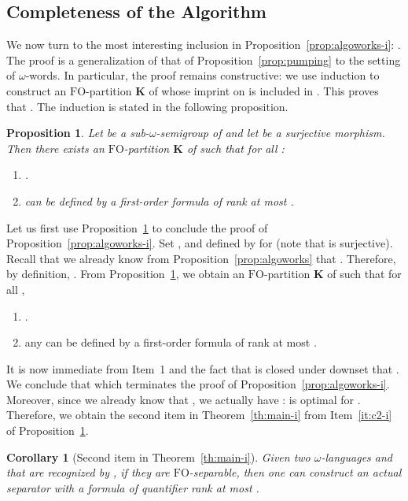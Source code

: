\documentclass{CSML}
\newcommand\Kb{\ensuremath{\mathbf{K}}\xspace}
\newcommand{\fo}{\ensuremath{\text{FO}}\xspace}
\newcommand\iwords{\ensuremath{\omega}-words\xspace}
\newcommand\ilangs{\ensuremath{\omega}-languages\xspace}
\newcommand\sisemi{sub-\ensuremath{\omega}-semigroup\xspace}
\theoremstyle{plain}
\newtheorem{corollary}[thm]{Corollary}
\newtheorem{proposition}[thm]{Proposition}
\begin{document}
\subsection{Completeness of the Algorithm}
\label{sec:compl-algor}

We now turn to the most interesting inclusion in
Proposition~\ref{prop:algoworks-i}: . The proof is a generalization of that of
Proposition~\ref{prop:pumping} to the setting of \iwords. In
particular, the proof remains constructive: we use induction to
construct an \fo-partition \Kb of  whose imprint on
 is included in . This proves that
. The induction is stated in the following
proposition.

\begin{proposition} \label{prop:pumping-i}
Let  be a \sisemi of\/  and let  be a surjective morphism. Then
there exists an \fo-partition \Kb of  such that for all :

\begin{enumerate}
\item\label{it:c1-i} .
\item\label{it:c2-i}  can be defined by a first-order formula
  of rank at most .
\end{enumerate}
\end{proposition}

Let us first use Proposition~\ref{prop:pumping-i} to conclude the
proof of Proposition~\ref{prop:algoworks-i}. Set ,  and 
defined by  for 
(note that  is surjective). Recall that we already know from
Proposition~\ref{prop:algoworks} that . Therefore, by definition, . From Proposition~\ref{prop:pumping-i}, we
obtain an \fo-partition \Kb of  such that  for all ,
\begin{enumerate}
\item .
\item any  can be defined by a first-order formula
  of rank at most .
\end{enumerate}

It is now immediate from Item~1 and the fact that
 is closed under downset that
. We conclude
that  which terminates the proof of
Proposition~\ref{prop:algoworks-i}. Moreover, since we already know
that , we actually
have :  is optimal
for . Therefore, we obtain the second item in
Theorem~\ref{th:main-i} from Item~\ref{it:c2-i} of Proposition~\ref{prop:pumping-i}.

\begin{corollary}[Second item in Theorem~\ref{th:main-i}]
Given two \ilangs  and  that are recognized by ,
if they are \fo-separable, then one can construct an actual separator with
a formula of quantifier rank at most .
\end{corollary}
\enlargethispage{\baselineskip}
\end{document}

